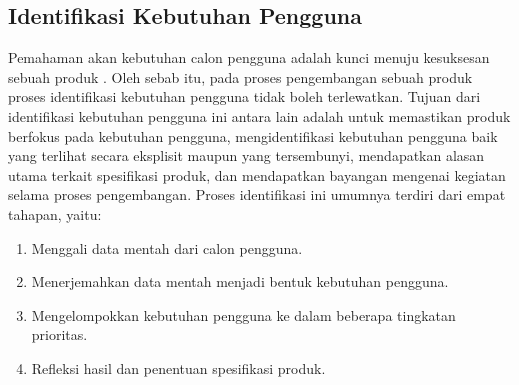 \subsection{Identifikasi Kebutuhan Pengguna}
Pemahaman akan kebutuhan calon pengguna adalah kunci menuju kesuksesan sebuah produk \cite{bukuUlrich}. Oleh sebab itu, pada proses pengembangan sebuah produk proses identifikasi kebutuhan pengguna tidak boleh terlewatkan. Tujuan dari identifikasi kebutuhan pengguna ini antara lain adalah untuk memastikan produk berfokus pada kebutuhan pengguna, mengidentifikasi kebutuhan pengguna baik yang terlihat secara eksplisit maupun yang tersembunyi, mendapatkan alasan utama terkait spesifikasi produk, dan mendapatkan bayangan mengenai kegiatan selama proses pengembangan. Proses identifikasi ini umumnya terdiri dari empat tahapan, yaitu:
\begin{enumerate}
    \item Menggali data mentah dari calon pengguna.
    \item Menerjemahkan data mentah menjadi bentuk kebutuhan pengguna.
    \item Mengelompokkan kebutuhan pengguna ke dalam beberapa tingkatan prioritas.
    \item Refleksi hasil dan penentuan spesifikasi produk.
\end{enumerate}

